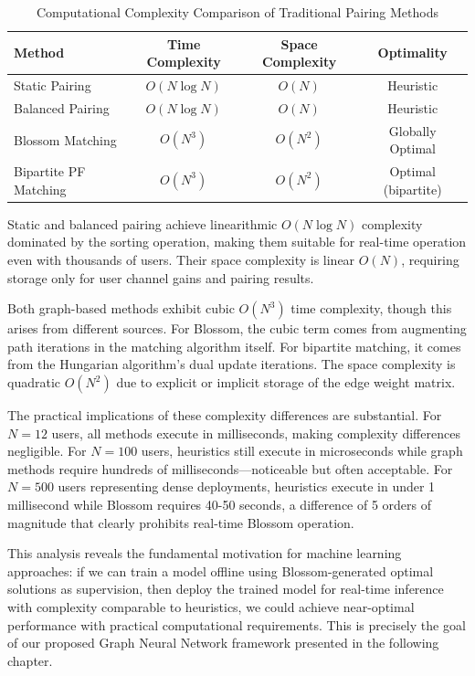\begin{table}[h]
\centering
\caption{Computational Complexity Comparison of Traditional Pairing Methods}
\label{tab:complexity_comparison}
\begin{tabular}{lccc}
\toprule
\textbf{Method} & \textbf{Time Complexity} & \textbf{Space Complexity} & \textbf{Optimality} \\
\midrule
Static Pairing & $O(N \log N)$ & $O(N)$ & Heuristic \\
Balanced Pairing & $O(N \log N)$ & $O(N)$ & Heuristic \\
Blossom Matching & $O(N^3)$ & $O(N^2)$ & Globally Optimal \\
Bipartite PF Matching & $O(N^3)$ & $O(N^2)$ & Optimal (bipartite) \\
\bottomrule
\end{tabular}
\end{table}

Static and balanced pairing achieve linearithmic $O(N \log N)$ complexity dominated by the sorting operation, making them suitable for real-time operation even with thousands of users. Their space complexity is linear $O(N)$, requiring storage only for user channel gains and pairing results.

Both graph-based methods exhibit cubic $O(N^3)$ time complexity, though this arises from different sources. For Blossom, the cubic term comes from augmenting path iterations in the matching algorithm itself. For bipartite matching, it comes from the Hungarian algorithm's dual update iterations. The space complexity is quadratic $O(N^2)$ due to explicit or implicit storage of the edge weight matrix.

The practical implications of these complexity differences are substantial. For $N = 12$ users, all methods execute in milliseconds, making complexity differences negligible. For $N = 100$ users, heuristics still execute in microseconds while graph methods require hundreds of milliseconds—noticeable but often acceptable. For $N = 500$ users representing dense deployments, heuristics execute in under 1 millisecond while Blossom requires 40-50 seconds, a difference of 5 orders of magnitude that clearly prohibits real-time Blossom operation.

This analysis reveals the fundamental motivation for machine learning approaches: if we can train a model offline using Blossom-generated optimal solutions as supervision, then deploy the trained model for real-time inference with complexity comparable to heuristics, we could achieve near-optimal performance with practical computational requirements. This is precisely the goal of our proposed Graph Neural Network framework presented in the following chapter.


